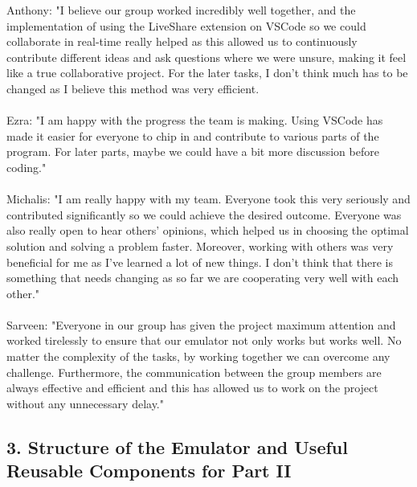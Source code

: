 \documentclass[a4paper]{article}
\begin{document}
Anthony: "I believe our group worked incredibly well together, and the implementation of using the LiveShare extension
        on VSCode so we could collaborate in real-time really helped as this allowed us to continuously
        contribute different ideas and ask questions where we were unsure, making it feel like a true collaborative project.
        For the later tasks, I don't think much has to be changed as I believe this method was very efficient.
\\ \\
Ezra: "I am happy with the progress the team is making. Using VSCode has made it easier for everyone to chip in and 
             contribute to various parts of the program. For later parts, maybe we could have a bit more discussion before coding."
\\ \\
Michalis: "I am really happy with my team. Everyone took this very seriously and contributed significantly so            
we could achieve the desired outcome. Everyone was also really open to hear others' opinions, which helped us in choosing the optimal 
solution and solving a problem faster. Moreover, working with others was very beneficial for me as I've learned a lot of
new things. I don't think that there is something that needs changing as so far we are cooperating very well with each other."
\\ \\
Sarveen: "Everyone in our group has given the project maximum attention and worked tirelessly to ensure that our 
emulator not only works but works well. No matter the complexity of the tasks, by working together we can overcome any challenge. Furthermore, the communication between the group members are always effective and efficient
and this has allowed us to work on the project without any unnecessary delay."

\bigskip
\subsection*{3. Structure of the Emulator and Useful Reusable Components for Part II}
\end{document}
